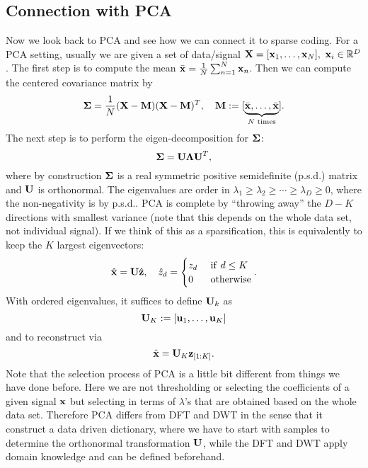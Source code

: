 \documentclass[../book-template.tex]{subfiles}
\begin{document}
\subsection{Connection with PCA}
Now we look back to PCA and see how we can connect it to sparse coding. For a PCA setting, usually we are given a set of data/signal ${\bf X}=[{\bf x}_1,\dots,{\bf x}_N],\ {\bf x}_i\in \mathbb{R}^D$. The first step is to compute the mean $\bar{\bf x}=\frac{1}{N}\sum_{n=1}^{N}{\bf x}_n$. Then we can compute the centered covariance matrix by
\begin{equation*}
	{\bf \Sigma}=\frac{1}{N}({\bf X-M})({\bf X-M})^T,\quad {\bf M}:=[\underbrace{\bar{\bf x},\dots,\bar{\bf x}}_{N\text{ times}}].
\end{equation*}
The next step is to perform the eigen-decomposition for ${\bf \Sigma}$:
\begin{equation*}
	{\bf \Sigma}={\bf U\Lambda U}^T,
\end{equation*}
where by construction ${\bf \Sigma}$ is a real symmetric positive semidefinite (p.s.d.) matrix and ${\bf U}$ is orthonormal. The eigenvalues are order in $\lambda_1\geq \lambda_2\geq \cdots\geq \lambda_D\geq 0$, where the non-negativity is by p.s.d.. PCA is complete by ``throwing away'' the $D-K$ directions with smallest variance (note that this depends on the whole data set, not individual signal). If we think of this as a sparsification, this is equivalently to keep the $K$ largest eigenvectors:
\begin{equation*}
	\hat{\bf x}={\bf U}\hat{\bf z},\quad \hat{z}_d = \begin{cases}
	z_d&\ {\rm if}\ d\leq K\\
	0&\ {\rm otherwise}
	\end{cases}.
\end{equation*}
With ordered eigenvalues, it suffices to define ${\bf U}_k$ as
\begin{equation*}
	{\bf U}_K:=[{\bf u}_1,\dots,{\bf u}_K]
\end{equation*}
and to reconstruct via
\begin{equation*}
	\hat{\bf x}={\bf U}_K{\bf z}_{[1:K]}.
\end{equation*}
Note that the selection process of PCA is a little bit different from things we have done before. Here we are not thresholding or selecting the coefficients of a given signal ${\bf x}$ but selecting in terms of $\lambda$'s that are obtained based on the whole data set. Therefore PCA differs from DFT and DWT in the sense that it construct a data driven dictionary, where we have to start with samples to determine the orthonormal transformation ${\bf U}$, while the DFT and DWT apply domain knowledge and can be defined beforehand.
\end{document}
